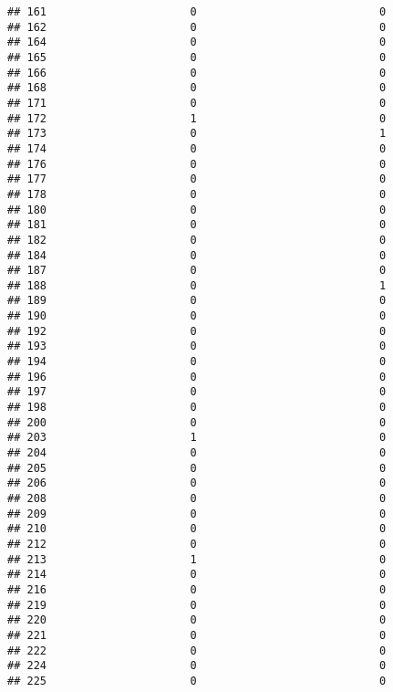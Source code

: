 \documentclass[
]{article}
\begin{document}
\begin{verbatim}
## 161                      0                            0
## 162                      0                            0
## 164                      0                            0
## 165                      0                            0
## 166                      0                            0
## 168                      0                            0
## 171                      0                            0
## 172                      1                            0
## 173                      0                            1
## 174                      0                            0
## 176                      0                            0
## 177                      0                            0
## 178                      0                            0
## 180                      0                            0
## 181                      0                            0
## 182                      0                            0
## 184                      0                            0
## 187                      0                            0
## 188                      0                            1
## 189                      0                            0
## 190                      0                            0
## 192                      0                            0
## 193                      0                            0
## 194                      0                            0
## 196                      0                            0
## 197                      0                            0
## 198                      0                            0
## 200                      0                            0
## 203                      1                            0
## 204                      0                            0
## 205                      0                            0
## 206                      0                            0
## 208                      0                            0
## 209                      0                            0
## 210                      0                            0
## 212                      0                            0
## 213                      1                            0
## 214                      0                            0
## 216                      0                            0
## 219                      0                            0
## 220                      0                            0
## 221                      0                            0
## 222                      0                            0
## 224                      0                            0
## 225                      0                            0

\end{verbatim}
\end{document}
